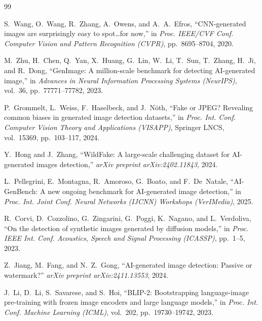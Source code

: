 
\begin{thebibliography}{99}

S.~Wang, O.~Wang, R.~Zhang, A.~Owens, and A.~A.~Efros,
``CNN-generated images are surprisingly easy to spot\ldots for now,''
in \emph{Proc. IEEE/CVF Conf. Computer Vision and Pattern Recognition
(CVPR)}, pp.\ 8695--8704, 2020.

M.~Zhu, H.~Chen, Q.~Yan, X.~Huang, G.~Lin, W.~Li, T.~Sun,
T.~Zhang, H.~Ji, and R.~Dong,
``GenImage: A million-scale benchmark for detecting AI-generated
image,''
in \emph{Advances in Neural Information Processing Systems (NeurIPS)},
vol.\ 36, pp.\ 77771--77782, 2023.

P.~Grommelt, L.~Weiss, F.~Haselbeck, and J.~N{\"o}th,
``Fake or JPEG? Revealing common biases in generated image detection
datasets,''
in \emph{Proc. Int. Conf. Computer Vision Theory and Applications
(VISAPP)}, Springer LNCS, vol.\ 15369, pp.\ 103--117, 2024.

Y.~Hong and J.~Zhang,
``WildFake: A large-scale challenging dataset for AI-generated images
detection,''
\emph{arXiv preprint arXiv:2402.11843}, 2024.

L.~Pellegrini, E.~Montagna, R.~Amoroso, G.~Boato, and
F.~De~Natale,
``AI-GenBench: A new ongoing benchmark for AI-generated image
detection,''
in \emph{Proc. Int. Joint Conf. Neural Networks (IJCNN) Workshops
(VerIMedia)}, 2025.

R.~Corvi, D.~Cozzolino, G.~Zingarini, G.~Poggi, K.~Nagano, and
L.~Verdoliva,
``On the detection of synthetic images generated by diffusion
models,''
in \emph{Proc. IEEE Int. Conf. Acoustics, Speech and Signal
Processing (ICASSP)}, pp.\ 1--5, 2023.

Z.~Jiang, M.~Fang, and N.~Z.~Gong,
``AI-generated image detection: Passive or watermark?''
\emph{arXiv preprint arXiv:2411.13553}, 2024.

J.~Li, D.~Li, S.~Savarese, and S.~Hoi,
``BLIP-2: Bootstrapping language-image pre-training with frozen image
encoders and large language models,''
in \emph{Proc. Int. Conf. Machine Learning (ICML)},
vol.\ 202, pp.\ 19730--19742, 2023.


\end{thebibliography}
